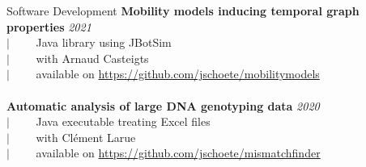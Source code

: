\documentclass[french]{resume} %
\begin{document}
\newpage

\begin{rSection}{Software Development}
	{\bf Mobility models inducing temporal graph properties} \hfill {\em 2021}\\
	$| \qquad$ Java library using JBotSim\\
	$| \qquad$ with Arnaud Casteigts\\
	$| \qquad$ available on \url{https://github.com/jschoete/mobilitymodels}\\
	\\
	{\bf Automatic analysis of large DNA genotyping data} \hfill {\em 2020}\\
	$| \qquad$ Java executable treating Excel files\\
	$| \qquad$ with Clément Larue\\
	$| \qquad$ available on \url{https://github.com/jschoete/mismatchfinder}
\end{rSection}
\end{document}
